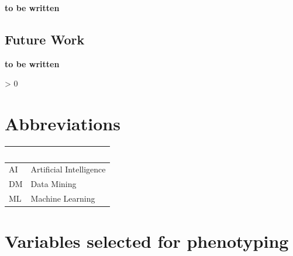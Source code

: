 \documentclass[
  oneside]{book}
\newlength{\cslhangindent}
\newenvironment{CSLReferences}[2] %
 {%
  \setlength{\parindent}{0pt}
  \ifodd #1 \everypar{\setlength{\hangindent}{\cslhangindent}}\ignorespaces\fi
  \ifnum #2 > 0
  \setlength{\parskip}{#2\baselineskip}
  \fi
 }%
 {}
\begin{document}
\textbf{to be written}

\hypertarget{summary-future-work}{%
\section{Future Work}\label{summary-future-work}}

\textbf{to be written}

\hypertarget{appendix-appendix}{%
\appendix}


\hypertarget{refs}{}
\begin{CSLReferences}{0}{0}
\end{CSLReferences}

\hypertarget{abbreviations}{%
\chapter*{Abbreviations}\label{abbreviations}}

\begin{longtable}[]{@{}ll@{}}
\toprule
~ & ~\tabularnewline
\midrule
\endhead
AI & Artificial Intelligence\tabularnewline
DM & Data Mining\tabularnewline
ML & Machine Learning\tabularnewline
\bottomrule
\end{longtable}

\hypertarget{appx-pheno}{%
\chapter{Variables selected for phenotyping}\label{appx-pheno}}
\end{document}
